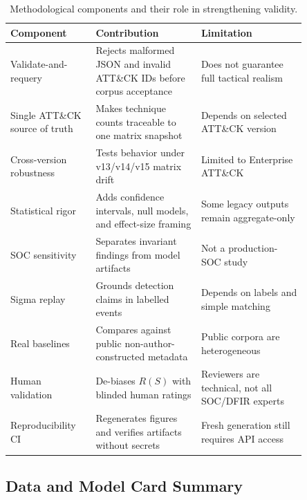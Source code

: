 \begin{table}[t]
\centering
\caption{Methodological components and their role in strengthening validity.}
\begin{tabular}{p{0.23\linewidth}p{0.31\linewidth}p{0.31\linewidth}}
\hline
Component & Contribution & Limitation \\
\hline
Validate-and-requery & Rejects malformed JSON and invalid ATT\&CK IDs before corpus acceptance & Does not guarantee full tactical realism \\
Single ATT\&CK source of truth & Makes technique counts traceable to one matrix snapshot & Depends on selected ATT\&CK version \\
Cross-version robustness & Tests behavior under v13/v14/v15 matrix drift & Limited to Enterprise ATT\&CK \\
Statistical rigor & Adds confidence intervals, null models, and effect-size framing & Some legacy outputs remain aggregate-only \\
SOC sensitivity & Separates invariant findings from model artifacts & Not a production-SOC study \\
Sigma replay & Grounds detection claims in labelled events & Depends on labels and simple matching \\
Real baselines & Compares against public non-author-constructed metadata & Public corpora are heterogeneous \\
Human validation & De-biases $R(S)$ with blinded human ratings & Reviewers are technical, not all SOC/DFIR experts \\
Reproducibility CI & Regenerates figures and verifies artifacts without secrets & Fresh generation still requires API access \\
\hline
\end{tabular}
\end{table}

\subsection{Data and Model Card Summary}

